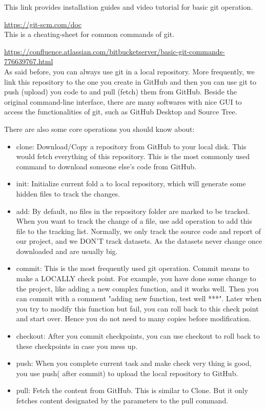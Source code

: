 \documentclass[12pt, fullpage,letterpaper]{article}
\begin{document}
This link provides installation guides and video tutorial for basic git operation.

\href{https://git-scm.com/doc}{https://git-scm.com/doc}\\

This is a cheating-sheet for common commands of git.

\href{https://confluence.atlassian.com/bitbucketserver/basic-git-commands-776639767.html}{https://confluence.atlassian.com/bitbucketserver/basic-git-commands-776639767.html}\\

As said before, you can always use git in a local repository. More frequently, we link this repository to the one you create in GitHub and then you can use git to push (upload) you code to and pull (fetch) them from GitHub. Beside the original command-line interface, there are many softwares with nice GUI to access the functionalities of git, such as GitHub Desktop and Source Tree. 


There are also some core operations you should know about:
\begin{itemize}
	\item clone: Download/Copy a repository from GitHub to your local disk. This would fetch everything of this repository. This is the most commonly used command to download someone else's code from GitHub.
	
	\item init: Initialize current fold a to local repository, which will generate some hidden files to track the changes.
	
	\item add: By default, no files in the repository folder are marked to be tracked. When you want to track the change of a file, use add operation to add this file to the tracking list. Normally, we only track the source code and report of our project, and we DON'T track datasets. As the datasets  never change once downloaded and are usually big. 
	
	\item commit: This is the most frequently used git operation. Commit means to make a LOCALLY check point. For example, you have done some change to the project, like adding a new  complex function, and it works well. Then you can commit with a comment "adding new function, test well ***". Later when you try to modify this function but fail, you can roll back to this check point and start over. Hence you do not need to  many copies before modification. 
	
	\item checkout: After you commit checkpoints, you can use checkout to roll back to these checkpoints in case you mess up.
	
	\item push: When you complete current task and make check very thing is good, you use push( after commit) to upload the local repository to GitHub. 
	
	\item pull: Fetch the content from GitHub. This is similar to Clone. But it only fetches content designated by the  parameters to the pull command.    
\end{itemize}
\end{document}
